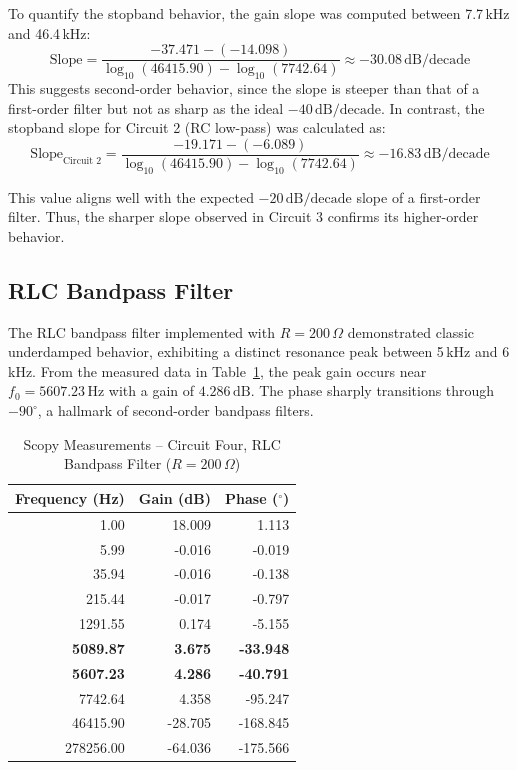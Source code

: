\documentclass[12pt]{article}
\begin{document}
To quantify the stopband behavior, the gain slope was computed between 7.7 kHz and 46.4 kHz:
\[
\text{Slope} = \frac{-37.471 - (-14.098)}{\log_{10}(46415.90) - \log_{10}(7742.64)} \approx -30.08\,\mathrm{dB/decade}
\]
This suggests second-order behavior, since the slope is steeper than that of a first-order filter but not as sharp as the ideal $-40\,\mathrm{dB/decade}$. In contrast, the stopband slope for Circuit 2 (RC low-pass) was calculated as:
\[
\text{Slope}_{\text{Circuit 2}} = \frac{-19.171 - (-6.089)}{\log_{10}(46415.90) - \log_{10}(7742.64)} \approx -16.83\,\mathrm{dB/decade}
\]

This value aligns well with the expected $-20\,\mathrm{dB/decade}$ slope of a first-order filter. Thus, the sharper slope observed in Circuit 3 confirms its higher-order behavior.

\subsection{RLC Bandpass Filter}

The RLC bandpass filter implemented with $R = 200\,\Omega$ demonstrated classic underdamped behavior, exhibiting a distinct resonance peak between 5\,kHz and 6\,kHz. From the measured data in Table~\ref{tab:rlc_bandpass}, the peak gain occurs near $f_0 = 5607.23\,\mathrm{Hz}$ with a gain of $4.286\,\mathrm{dB}$. The phase sharply transitions through $-90^\circ$, a hallmark of second-order bandpass filters.

\begin{table}[H]
	\centering
	\caption{Scopy Measurements – Circuit Four, RLC Bandpass Filter ($R=200\,\Omega$)}
	\label{tab:rlc_bandpass}
	\begin{tabular}{|r|r|r|}
		\hline
		\textbf{Frequency (Hz)} & \textbf{Gain (dB)} & \textbf{Phase ($^\circ$)} \\
		\hline
		1.00        & 18.009  & 1.113    \\
		5.99        & -0.016  & -0.019   \\
		35.94       & -0.016  & -0.138   \\
		215.44      & -0.017  & -0.797   \\
		1291.55     & 0.174   & -5.155   \\
		\textbf{5089.87} & \textbf{3.675} & \textbf{-33.948} \\
		\textbf{5607.23} & \textbf{4.286} & \textbf{-40.791} \\
		7742.64     & 4.358   & -95.247  \\
		46415.90    & -28.705 & -168.845 \\
		278256.00   & -64.036 & -175.566 \\
		\hline
	\end{tabular}
\end{table}
\end{document}
